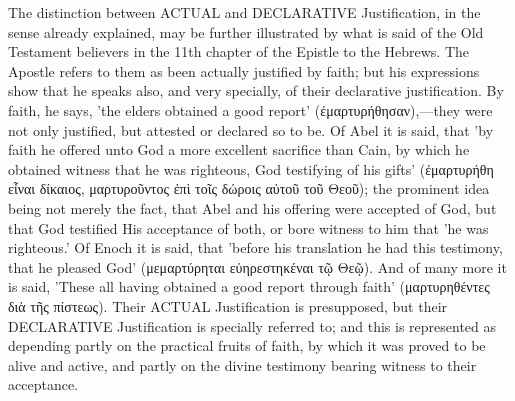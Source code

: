 \documentclass[
]{book}
\begin{document}
The distinction between ACTUAL and DECLARATIVE Justification, in the sense already explained, may be further illustrated by what is said of the Old Testament believers in the 11th chapter of the Epistle to the Hebrews. The Apostle refers to them as been actually justified by faith; but his expressions show that he speaks also, and very specially, of their declarative justification. By faith, he says, 'the elders obtained a good report' (ἐμαρτυρήθησαν),---they were not only justified, but attested or declared so to be. Of Abel it is said, that 'by faith he offered unto God a more excellent sacrifice than Cain, by which he obtained witness that he was righteous, God testifying of his gifts' (ἐμαρτυρήθη εἶναι δίκαιος, μαρτυροῦντος ἐπὶ τοῖς δώροις αὐτοῦ τοῦ Θεοῦ); the prominent idea being not merely the fact, that Abel and his offering were accepted of God, but that God testified His acceptance of both, or bore witness to him that 'he was righteous.' Of Enoch it is said, that 'before his translation he had this testimony, that he pleased God' (μεμαρτύρηται εὐηρεστηκέναι τῷ Θεῷ). And of many more it is said, 'These all having obtained a good report through faith' (μαρτυρηθέντες διὰ τῆς πίστεως). Their ACTUAL Justification is presupposed, but their DECLARATIVE Justification is specially referred to; and this is represented as depending partly on the practical fruits of faith, by which it was proved to be alive and active, and partly on the divine testimony bearing witness to their acceptance.
\end{document}
